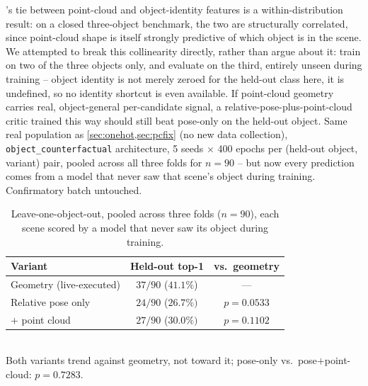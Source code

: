 \documentclass[journal]{IEEEtran}
\begin{document}
's tie between point-cloud and object-identity features
is a within-distribution result: on a closed three-object benchmark, the
two are structurally correlated, since point-cloud shape is itself
strongly predictive of which object is in the scene. We attempted to
break this collinearity directly, rather than argue about it: train on
two of the three objects only, and evaluate on the third, entirely
unseen during training -- object identity is not merely zeroed for the
held-out class here, it is undefined, so no identity shortcut is even
available. If point-cloud geometry carries real, object-general
per-candidate signal, a relative-pose-plus-point-cloud critic trained
this way should still beat pose-only on the held-out object. Same real
population as \cref{sec:onehot,sec:pcfix} (no new data collection),
\texttt{object\_counterfactual} architecture, 5 seeds $\times$ 400 epochs
per (held-out object, variant) pair, pooled across all three folds for
$n{=}90$ -- but now every prediction comes from a model that never saw
that scene's object during training. Confirmatory batch untouched.

\begin{table}[t]
\centering
\caption{Leave-one-object-out, pooled across three folds ($n{=}90$),
each scene scored by a model that never saw its object during training.}
\label{tab:loo}
\begin{tabular}{lcc}
\toprule
Variant & Held-out top-1 & vs.\ geometry \\
\midrule
Geometry (live-executed) & $37/90$ ($41.1\%$) & --- \\
Relative pose only       & $24/90$ ($26.7\%)$ & $p{=}0.0533$ \\
\; $+$ point cloud       & $27/90$ ($30.0\%)$ & $p{=}0.1102$ \\
\bottomrule
\end{tabular}
\\[0.3em]
{\footnotesize Both variants trend against geometry, not toward it; pose-only vs.\ pose$+$point-cloud: $p{=}0.7283$.}
\end{table}
\end{document}
